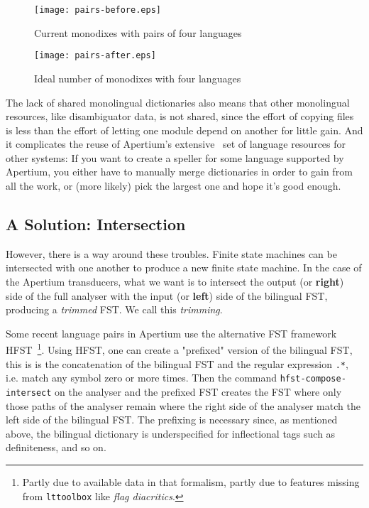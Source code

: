\documentclass[10pt, a4paper]{article}
\newcommand{\tool}[1]{\texttt{#1}}
\begin{document}
\begin{figure}[h]
  \begin{center}
    \texttt{[image: pairs-before.eps]}
    \caption{Current monodixes with pairs of four languages}
    \label{fig.1}
  \end{center}
\end{figure}


\begin{figure}[h]
  \begin{center}
    \texttt{[image: pairs-after.eps]}
    \caption{Ideal number of monodixes with four languages}
    \label{fig.1}
  \end{center}
\end{figure}

The lack of shared monolingual dictionaries also means that other
monolingual resources, like disambiguator data, is not shared, since
the effort of copying files is less than the effort of letting one
module depend on another for little gain. And it complicates the reuse
of Apertium's extensive~\cite{tyers2010fosresources} set of language
resources for other systems: If you want to create a speller for some
language supported by Apertium, you either have to manually merge
dictionaries in order to gain from all the work, or (more likely) pick
the largest one and hope it's good enough.

\subsection{A Solution: Intersection}
\label{sec:solution}

However, there is a way around these troubles. Finite state machines
can be intersected with one another to produce a new finite state
machine. In the case of the Apertium transducers, what we want is to
intersect the output (or \textbf{right}) side of the full analyser
with the input (or \textbf{left}) side of the bilingual FST, producing
a \emph{trimmed} FST. We call this \emph{trimming}.

Some recent language pairs in Apertium use the alternative FST
framework HFST~\cite{linden2011hfst}\footnote{Partly due to available
  data in that formalism, partly due to features missing from
  \tool{lttoolbox} like \emph{flag diacritics}.}. Using HFST, one can
create a "prefixed" version of the bilingual FST, this is is the
concatenation of the bilingual FST and the regular expression
\texttt{.*}, i.e. match any symbol zero or more times. Then the command
\tool{hfst-compose-intersect} on the analyser and the prefixed FST
creates the FST where only those paths of the analyser remain where
the right side of the analyser match the left side of the bilingual
FST. The prefixing is necessary since, as mentioned above, the
bilingual dictionary is underspecified for inflectional tags such as
definiteness, and so on.
\end{document}
